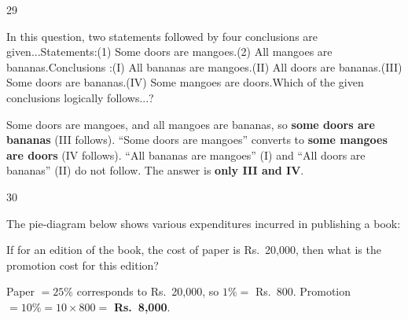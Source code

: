 \begin{question}{29}
{In this question, two statements followed by four conclusions are given...\newline Statements:\newline (1) Some doors are mangoes.\newline (2) All mangoes are bananas.\newline Conclusions :\newline (I) All bananas are mangoes.\newline (II) All doors are bananas.\newline (III) Some doors are bananas.\newline (IV) Some mangoes are doors.\newline Which of the given conclusions logically follows...?\par}
\begin{explain}
\begin{center}
\end{center}
Some doors are mangoes, and all mangoes are bananas, so \textbf{some doors are bananas} (III follows). ``Some doors are mangoes'' converts to \textbf{some mangoes are doors} (IV follows). ``All bananas are mangoes'' (I) and ``All doors are bananas'' (II) do not follow. The answer is \textbf{only III and IV}.
\end{explain}
\end{question}

\begin{question}{30}
{The pie-diagram below shows various expenditures incurred in publishing a book:\par}
If for an edition of the book, the cost of paper is Rs.~20,000, then what is the promotion cost for this edition?
\begin{explain}
Paper $=25\%$ corresponds to Rs.~20,000, so $1\%=$ Rs.~800.
Promotion $=10\%=10\times800=$ \textbf{Rs.~8,000}.
\end{explain}
\end{question}

